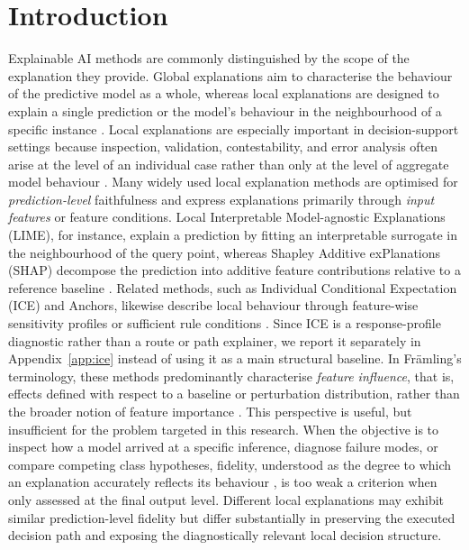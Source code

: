 \documentclass[runningheads]{llncs}
\begin{document}
\section{Introduction}
Explainable AI methods are commonly distinguished by the scope of the explanation they provide. Global explanations aim to characterise the behaviour of the predictive model as a whole, whereas local explanations are designed to explain a single prediction or the model's behaviour in the neighbourhood of a specific instance \cite{lundberg2020local,vilone2021notions,setzu2021glocalx}. Local explanations are especially important in decision-support settings because inspection, validation, contestability, and error analysis often arise at the level of an individual case rather than only at the level of aggregate model behaviour \cite{nauta2023anecdotal}.
Many widely used local explanation methods are optimised for \emph{prediction-level} faithfulness and express explanations primarily through \emph{input features} or feature conditions. Local Interpretable Model-agnostic Explanations (LIME), for instance, explain a prediction by fitting an interpretable surrogate in the neighbourhood of the query point, whereas Shapley Additive exPlanations (SHAP) decompose the prediction into additive feature contributions relative to a reference baseline \cite{ribeiro2016why,lundberg2017unified}. Related methods, such as Individual Conditional Expectation (ICE) and Anchors, likewise describe local behaviour through feature-wise sensitivity profiles or sufficient rule conditions \cite{goldstein2015ice,ribeiro2018anchors}. Since ICE is a response-profile diagnostic rather than a route or path explainer, we report it separately in Appendix~\ref{app:ice} instead of using it as a main structural baseline. In Fr\"amling's terminology, these methods predominantly characterise \emph{feature influence}, that is, effects defined with respect to a baseline or perturbation distribution, rather than the broader notion of feature importance \cite{framling2023importanceinfluence}.
This perspective is useful, but insufficient for the problem targeted in this research. When the objective is to inspect how a model arrived at a specific inference, diagnose failure modes, or compare competing class hypotheses, fidelity, understood as the degree to which an explanation accurately reflects its behaviour \cite{vilone2021notions}, is too weak a criterion when only assessed at the final output level. Different local explanations may exhibit similar prediction-level fidelity but differ substantially in preserving the executed decision path and exposing the diagnostically relevant local decision structure.
\end{document}
